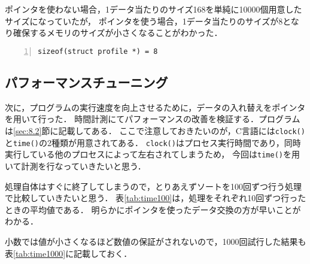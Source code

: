\documentclass[autodetect-engine,dvi=dvipdfmx,ja=standard,
               a4j,11pt]{bxjsarticle}
\begin{document}
ポインタを使わない場合，1データ当たりのサイズ168を単純に10000個用意したサイズになっていたが，
ポインタを使う場合，1データ当たりのサイズが8となり確保するメモリのサイズが小さくなることがわかった．

\begin{Verbatim}[numbers=left, xleftmargin=10mm, numbersep=6pt,
    fontsize=\small, baselinestretch=0.8]
    sizeof(struct profile *) = 8
\end{Verbatim}

\subsection{パフォーマンスチューニング}

次に，プログラムの実行速度を向上させるために，データの入れ替えをポインタを用いて行った．
時間計測にてパフォーマンスの改善を検証する．プログラムは\ref{sec:8.2}節に記載してある．
ここで注意しておきたいのが，C言語には\verb|clock()|と\verb|time()|の2種類が用意されてある．
\verb|clock()|はプロセス実行時間であり，同時実行している他のプロセスによって左右されてしまうため，
今回は\verb|time()|を用いて計測を行なっていきたいと思う．

処理自体はすぐに終了してしまうので，とりあえずソートを100回ずつ行う処理で比較していきたいと思う．
表\ref{tab:time100}は，処理をそれぞれ10回ずつ行ったときの平均値である．
明らかにポインタを使ったデータ交換の方が早いことがわかる．

小数では値が小さくなるほど数値の保証がされないので，1000回試行した結果も表\ref{tab:time1000}に記載しておく．
\end{document}
